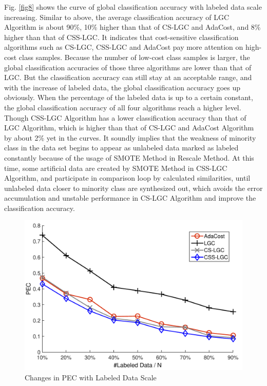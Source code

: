 \documentclass{svjour3}                     %
\begin{document}
Fig. \ref{fig8} shows the curve of global classification accuracy with labeled data scale increasing. Similar to above, the average classification accuracy of LGC Algorithm is about 90\%, 10\% higher than that of CS-LGC and AdaCost, and 8\% higher than that of CSS-LGC. It indicates that cost-sensitive classification algorithms such as CS-LGC, CSS-LGC and AdaCost pay more attention on high-cost class samples. Because the number of low-cost class samples is larger, the global classification accuracies of those three algorithms are lower than that of LGC. But the classification accuracy can still stay at an acceptable range, and with the increase of labeled data, the global classification accuracy goes up obviously.  When the percentage of the labeled data is up to a certain constant, the global classification accuracy of all four algorithms reach a higher level. Though CSS-LGC Algorithm has a lower classification accuracy than that of LGC Algorithm, which is higher than that of CS-LGC and  AdaCost Algorithm by about 2\% yet in the curves. It soundly implies that the weakness of minority class in the data set begins to appear as unlabeled data marked as labeled constantly because of the usage of SMOTE Method in Rescale Method. At this time, some artificial data are created by SMOTE Method in CSS-LGC Algorithm, and participate in comparison loop by calculated similarities, until unlabeled data closer to minority class are synthesized out, which avoids the error accumulation and unstable performance in CS-LGC Algorithm and improve the classification accuracy.%

\begin{figure}[ht]
\includegraphics[width=\textwidth]{plot/fig9.pdf}
\caption{Changes in PEC with Labeled Data Scale} \label{fig9}
\end{figure}
\end{document}
